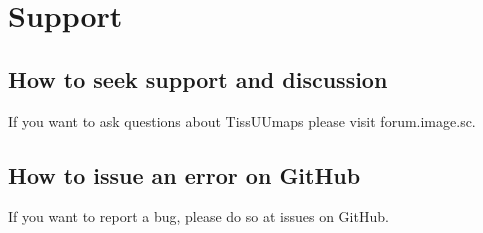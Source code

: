 \documentclass[letterpaper,10pt,english,openany,oneside]{sphinxmanual}
\begin{document}
\begin{sphinxVerbatim}[commandchars=\\\{\}]
\PYG{p}{],}
\PYG{p}{[}
\PYG{p}{],}
\end{sphinxVerbatim}

\sphinxstepscope


\chapter{Support}
\label{\detokenize{docs/support/index:support}}\label{\detokenize{docs/support/index::doc}}

\section{How to seek support and discussion}
\label{\detokenize{docs/support/index:how-to-seek-support-and-discussion}}
\sphinxAtStartPar
If you want to ask questions about TissUUmaps please visit forum.image.sc.


\section{How to issue an error on GitHub}
\label{\detokenize{docs/support/index:how-to-issue-an-error-on-github}}
\sphinxAtStartPar
If you want to report a bug, please do so at issues on GitHub.



\renewcommand{\indexname}{Index}
\printindex
\end{document}
